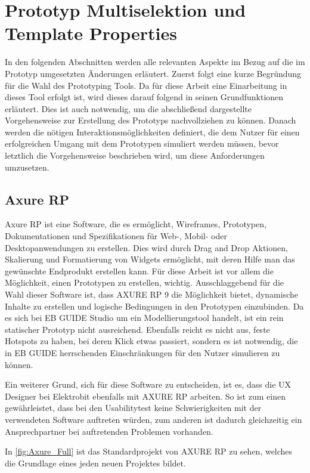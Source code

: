 \section {Prototyp Multiselektion und Template Properties}
In den folgenden Abschnitten werden alle relevanten Aspekte im Bezug auf die im Prototyp umgesetzten Änderungen erläutert.
Zuerst folgt eine kurze Begründung für die Wahl des Prototyping Tools.
Da für diese Arbeit eine Einarbeitung in dieses Tool erfolgt ist, wird dieses darauf folgend in seinen Grundfunktionen erläutert.
Dies ist auch notwendig, um die abschließend dargestellte Vorgehensweise zur Erstellung des Prototyps nachvollziehen zu können.
Danach werden die nötigen Interaktionsmöglichkeiten definiert, die dem Nutzer für einen erfolgreichen Umgang mit dem Prototypen simuliert werden müssen, bevor letztlich die Vorgehensweise beschrieben wird, um diese Anforderungen umzusetzen.

\subsection {Axure RP}
\label{ch:axure}
Axure RP ist eine Software, die es ermöglicht, Wireframes, Prototypen, Dokumentationen und Spezifikationen für Web-, Mobil- oder Desktopanwendungen zu erstellen.
Dies wird durch Drag and Drop Aktionen, Skalierung und Formatierung von Widgets ermöglicht, mit deren Hilfe man das gewünschte Endprodukt erstellen kann.
Für diese Arbeit ist vor allem die Möglichkeit, einen Prototypen zu erstellen, wichtig.
Ausschlaggebend für die Wahl dieser Software ist, dass AXURE RP 9 die Möglichkeit bietet, dynamische Inhalte zu erstellen und logische Bedingungen in den Prototypen einzubinden.
Da es sich bei EB GUIDE Studio um ein Modellierungstool handelt, ist ein rein statischer Prototyp nicht ausreichend.
Ebenfalls reicht es nicht aus, feste Hotspots zu haben, bei deren Klick etwas passiert, sondern es ist notwendig, die in EB GUIDE herrschenden Einschränkungen für den Nutzer simulieren zu können.

Ein weiterer Grund, sich für diese Software zu entscheiden, ist es, dass die UX Designer bei Elektrobit ebenfalls mit AXURE RP arbeiten.
So ist zum einen gewährleistet, dass bei den Usabilitytest keine Schwierigkeiten mit der verwendeten Software auftreten würden, zum anderen ist dadurch gleichzeitig ein Ansprechpartner bei auftretenden Problemen vorhanden.

In \cref{fig:Axure_Full} ist das Standardprojekt von AXURE RP zu sehen, welches die Grundlage eines jeden neuen Projektes bildet.

